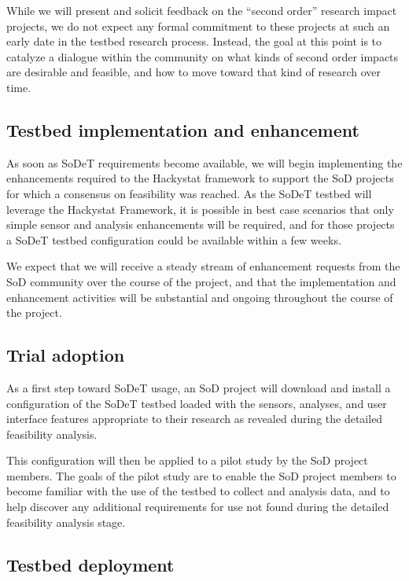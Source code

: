 While we will present and solicit feedback on the ``second order'' research
impact projects, we do not expect any formal commitment to these projects
at such an early date in the testbed research process. Instead, the goal at
this point is to catalyze a dialogue within the community on what kinds of
second order impacts are desirable and feasible, and how to move toward
that kind of research over time.

\subsection{Testbed implementation and enhancement}

As soon as SoDeT requirements become available, we will begin implementing 
the enhancements required to the Hackystat framework to support the SoD
projects for which a consensus on feasibility was reached.  As the SoDeT 
testbed will leverage the Hackystat Framework, it is possible in best case
scenarios that only simple sensor and analysis enhancements will be required,
and for those projects a SoDeT testbed configuration could be available within 
a few weeks.  

We expect that we will receive a steady stream of enhancement requests from the
SoD community over the course of the project, and that the implementation and
enhancement activities will be substantial and ongoing throughout the course of 
the project. 

\subsection{Trial adoption}

As a first step toward SoDeT usage, an SoD project will download and
install a configuration of the SoDeT testbed loaded with the sensors,
analyses, and user interface features appropriate to their research as
revealed during the detailed feasibility analysis.

This configuration will then be applied to a pilot study by the SoD project
members.  The goals of the pilot study are to enable the SoD project members to 
become familiar with the use of the testbed to collect and analysis data, and 
to help discover any additional requirements for use not found during the 
detailed feasibility analysis stage.  

\subsection{Testbed deployment}

